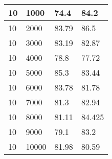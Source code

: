 \begin{table}
\begin{tabular}{|l|l|l|l|}
10	&1000	&74.4	&84.2     \\\hline
10	&2000	&83.79	&86.5     \\\hline
10	&3000	&83.19	&82.87    \\\hline
10	&4000	&78.8	&77.72    \\\hline
10	&5000	&85.3	&83.44    \\\hline
10	&6000	&83.78	&81.78    \\\hline
10	&7000	&81.3	&82.94    \\\hline
10	&8000	&81.11	&84.425   \\\hline
10	&9000	&79.1	&83.2     \\\hline
10	&10000	&81.98	&80.59    \\\hline

	\end{tabular}
\end{table}

